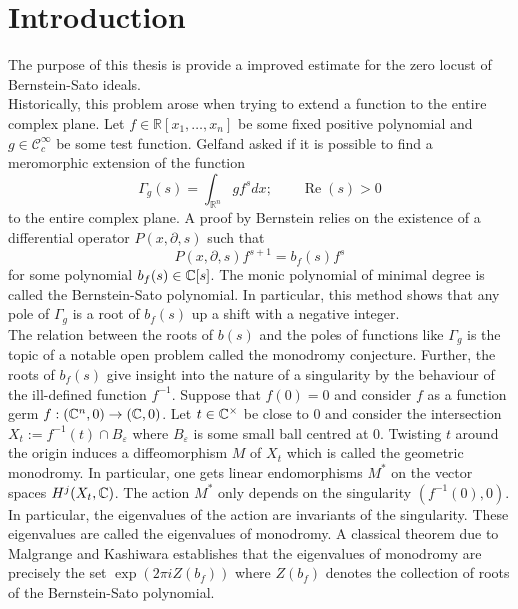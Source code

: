 \chapter*{Introduction}\label{ch: Introduction} %



The purpose of this thesis is provide a improved estimate for the zero locust of Bernstein-Sato ideals.\\

Historically, this problem arose when trying to extend a function to the entire complex plane.
Let $f\in \mathbb{R}[x_1,\ldots,x_n]$ be some fixed positive polynomial and $g \in \mathcal{C}_c^\infty$ be some test function.
Gelfand asked if it is possible to find a meromorphic extension of the function
$$\Gamma_g(s) = \int_{\mathbb{R}^n} g f^s dx; \qquad \operatorname{Re}(s)>0 $$
to the entire complex plane.
A proof by Bernstein relies on the existence of a differential operator $P(x,\partial, s)$ such that
$$P(x,\partial,s) f^{s+1} = b_f(s) f^s$$
for some polynomial $b_f(s)\in \mathbb{C}[s]$.
The monic polynomial of minimal degree is called the Bernstein-Sato polynomial.
In particular, this method shows that any pole of $\Gamma_g$ is a root of $b_f(s)$ up a shift with a negative integer.\\

The relation between the roots of $b(s)$ and the poles of functions like $\Gamma_g$ is the topic of a notable open problem called the monodromy conjecture.
Further, the roots of $b_f(s)$ give insight into the nature of a singularity by the behaviour of the ill-defined function $f^{-1}$.
Suppose that $f(0)= 0$ and consider $f$ as a function germ $f:(\mathbb{C}^n,0)\to (\mathbb{C},0)$.
Let $t\in \mathbb{C}^\times$ be close to $0$ and consider the intersection $X_t := f^{-1}(t)\cap B_\varepsilon$ where $B_\varepsilon$ is some small ball centred at $0$.
Twisting $t$ around the origin induces a diffeomorphism $M$ of $X_t$ which is called the geometric monodromy.
In particular, one gets linear endomorphisms $M^*$ on the vector spaces $H^j(X_t,\mathbb{C})$.
The action $M^*$ only depends on the singularity $(f^{-1}(0),0)$.
In particular, the eigenvalues of the action are invariants of the singularity.
These eigenvalues are called the eigenvalues of monodromy.
A classical theorem due to Malgrange and Kashiwara establishes that the eigenvalues of monodromy are precisely the set $\exp(2\pi i Z(b_f))$ where $Z(b_f)$ denotes the collection of roots of the Bernstein-Sato polynomial.

